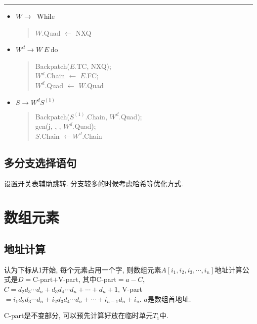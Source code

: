            \hrule

            \begin{itemize}
                \item $W\to\ $ While
                    \begin{verse}
                        $W$.Quad $\gets$ NXQ
                    \end{verse}
                \item $W^d\to W\ E\ $do
                    \begin{verse}
                        Backpatch($E$.TC, NXQ); \\
                        $W^d$.Chain $\gets$ $E$.FC; \\
                        $W^d$.Quad $\gets$ $W$.Quad
                    \end{verse}
                \item $S\to W^dS^{(1)}$
                    \begin{verse}
                        Backpatch($S^{(1)}$.Chain, $W^d$.Quad); \\
                        gen(j, \uline\quad, \uline\quad, $W^d$.Quad); \\
                        $S$.Chain $\gets W^d$.Chain
                    \end{verse}
            \end{itemize}


        \subsection{多分支选择语句}

            设置开关表辅助跳转. 分支较多的时候考虑哈希等优化方式.

    \section{数组元素}

        \subsection{地址计算}

            认为下标从1开始, 每个元素占用一个字, 则数组元素$A[i_1, i_2, i_3, \cdots, i_n]$地址计算公式是$D=$C-part$+$V-part, 其中C-part$=a-C$, $C=d_2d_3\cdots d_n+d_3d_4\cdots d_n+\cdots+d_n+1$, V-part$=i_1d_2d_3\cdots d_n+i_2d_3d_4\cdots d_n+\cdots+i_{n-1}d_n+i_n$. $a$是数组首地址.

            C-part是不变部分, 可以预先计算好放在临时单元$T_1$中.

